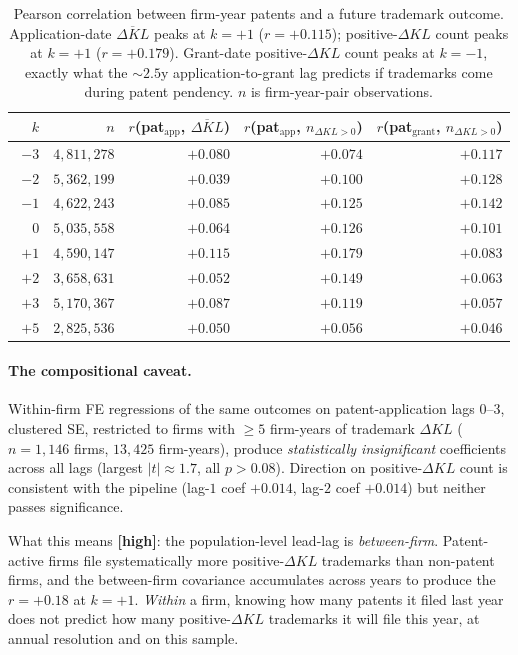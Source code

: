\documentclass[11pt]{article}
\newcommand{\dkl}{\Delta KL}
\begin{document}
\begin{table}[h]
\centering
\small
\begin{tabular}{rrrrr}
\toprule
$k$ & $n$ & $r$(pat$_{\text{app}}$, $\overline{\dkl}$) & $r$(pat$_{\text{app}}$, $n_{\dkl>0}$) & $r$(pat$_{\text{grant}}$, $n_{\dkl>0}$) \\
\midrule
$-3$ & $4{,}811{,}278$ & $+0.080$ & $+0.074$ & $+0.117$ \\
$-2$ & $5{,}362{,}199$ & $+0.039$ & $+0.100$ & $+0.128$ \\
$-1$ & $4{,}622{,}243$ & $+0.085$ & $+0.125$ & $\mathbf{+0.142}$ \\
$\phantom{+}0$ & $5{,}035{,}558$ & $+0.064$ & $+0.126$ & $+0.101$ \\
$+1$ & $4{,}590{,}147$ & $\mathbf{+0.115}$ & $\mathbf{+0.179}$ & $+0.083$ \\
$+2$ & $3{,}658{,}631$ & $+0.052$ & $+0.149$ & $+0.063$ \\
$+3$ & $5{,}170{,}367$ & $+0.087$ & $+0.119$ & $+0.057$ \\
$+5$ & $2{,}825{,}536$ & $+0.050$ & $+0.056$ & $+0.046$ \\
\bottomrule
\end{tabular}
\caption{Pearson correlation between firm-year patents and a future
trademark outcome. Application-date $\overline{\dkl}$ peaks at
$k=+1$ ($r = +0.115$); positive-$\dkl$ count peaks at $k=+1$
($r = +0.179$). Grant-date positive-$\dkl$ count peaks at $k=-1$,
exactly what the $\sim 2.5$y application-to-grant lag predicts if
trademarks come during patent pendency. $n$ is firm-year-pair
observations.}
\end{table}

\paragraph{The compositional caveat.} Within-firm FE regressions of
the same outcomes on patent-application lags $0$--$3$, clustered SE,
restricted to firms with $\geq 5$ firm-years of trademark $\dkl$
($n = 1{,}146$ firms, $13{,}425$ firm-years), produce
\emph{statistically insignificant} coefficients across all lags
(largest $|t| \approx 1.7$, all $p > 0.08$).  Direction on
positive-$\dkl$ count is consistent with the pipeline (lag-$1$
coef $+0.014$, lag-$2$ coef $+0.014$) but neither passes
significance.

What this means \textbf{[high]}: the population-level lead-lag is
\emph{between-firm}. Patent-active firms file systematically more
positive-$\dkl$ trademarks than non-patent firms, and the
between-firm covariance accumulates across years to produce the
$r = +0.18$ at $k = +1$. \emph{Within} a firm, knowing how many
patents it filed last year does not predict how many positive-$\dkl$
trademarks it will file this year, at annual resolution and on this
sample.
\end{document}
